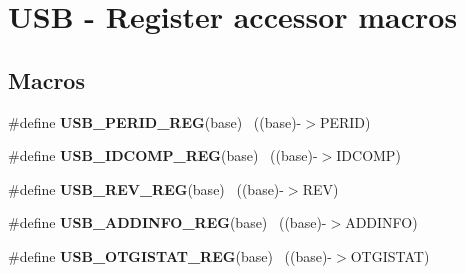 \hypertarget{group___u_s_b___register___accessor___macros}{}\section{U\+S\+B -\/ Register accessor macros}
\label{group___u_s_b___register___accessor___macros}
\subsection*{Macros}
\begin{DoxyCompactItemize}
\item 
\hypertarget{group___u_s_b___register___accessor___macros_gaf7ac61d8729d7357b45ebb18042334e5}{}\#define {\bfseries U\+S\+B\+\_\+\+P\+E\+R\+I\+D\+\_\+\+R\+E\+G}(base)                                        ~((base)-\/$>$P\+E\+R\+I\+D)\label{group___u_s_b___register___accessor___macros_gaf7ac61d8729d7357b45ebb18042334e5}

\item 
\hypertarget{group___u_s_b___register___accessor___macros_ga4ea3ccb3fd6a83a960e21b2a07fa78a4}{}\#define {\bfseries U\+S\+B\+\_\+\+I\+D\+C\+O\+M\+P\+\_\+\+R\+E\+G}(base)                                      ~((base)-\/$>$I\+D\+C\+O\+M\+P)\label{group___u_s_b___register___accessor___macros_ga4ea3ccb3fd6a83a960e21b2a07fa78a4}

\item 
\hypertarget{group___u_s_b___register___accessor___macros_gab7585eeb9bce74c027e9c8de01789e66}{}\#define {\bfseries U\+S\+B\+\_\+\+R\+E\+V\+\_\+\+R\+E\+G}(base)                                            ~((base)-\/$>$R\+E\+V)\label{group___u_s_b___register___accessor___macros_gab7585eeb9bce74c027e9c8de01789e66}

\item 
\hypertarget{group___u_s_b___register___accessor___macros_gad4babec546f000e557c561d031504513}{}\#define {\bfseries U\+S\+B\+\_\+\+A\+D\+D\+I\+N\+F\+O\+\_\+\+R\+E\+G}(base)                                    ~((base)-\/$>$A\+D\+D\+I\+N\+F\+O)\label{group___u_s_b___register___accessor___macros_gad4babec546f000e557c561d031504513}

\item 
\hypertarget{group___u_s_b___register___accessor___macros_gad864de812bd346fc2c67bb93e75de5bb}{}\#define {\bfseries U\+S\+B\+\_\+\+O\+T\+G\+I\+S\+T\+A\+T\+\_\+\+R\+E\+G}(base)                                  ~((base)-\/$>$O\+T\+G\+I\+S\+T\+A\+T)\label{group___u_s_b___register___accessor___macros_gad864de812bd346fc2c67bb93e75de5bb}


\end{DoxyCompactItemize}
